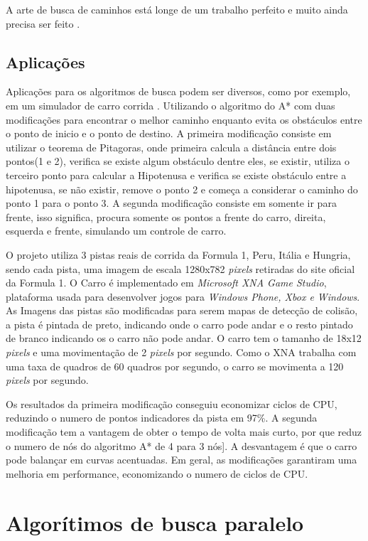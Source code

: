 A arte de busca de caminhos está longe de um trabalho perfeito e muito ainda precisa ser feito \cite{Pontevia}.

\subsection{Aplicações}
Aplicações para os algoritmos de busca podem ser diversos, como por exemplo, em um simulador de carro corrida \cite{JungTing}. Utilizando o algoritmo do A* com duas modificações para encontrar o melhor caminho enquanto evita os obstáculos entre o ponto de inicio e o ponto de destino. 
A primeira modificação consiste em utilizar o teorema de Pitagoras, onde primeira calcula a distância entre dois pontos(1 e 2), verifica se existe algum obstáculo dentre eles, se existir, utiliza o terceiro ponto para calcular a Hipotenusa e verifica se existe obstáculo entre a hipotenusa, se não existir, remove o ponto 2 e começa a considerar o caminho do ponto 1 para o ponto 3. A segunda modificação consiste em somente ir para frente, isso significa, procura somente os pontos a frente do carro, direita, esquerda e frente, simulando um controle de carro.

O projeto utiliza 3 pistas reais de corrida da Formula 1, Peru, Itália e Hungria, sendo cada pista, uma imagem de escala 1280x782 \textit{pixels} retiradas do site oficial da Formula 1. O Carro é implementado em \textit{Microsoft XNA Game Studio}, plataforma usada para desenvolver jogos para \textit{Windows Phone, Xbox e Windows}. As Imagens das pistas são modificadas para serem mapas de detecção de colisão, a pista é pintada de preto, indicando onde o carro pode andar e o resto pintado de branco indicando os o carro não pode andar. O carro tem o tamanho de 18x12 \textit{pixels} e uma movimentação de 2 \textit{pixels} por segundo. Como o XNA trabalha com uma taxa de quadros de 60 quadros por segundo, o carro se movimenta a 120 \textit{pixels} por segundo.

Os resultados da primeira modificação conseguiu economizar ciclos de CPU, reduzindo o numero de pontos indicadores da pista em 97\%. A segunda modificação tem a vantagem de obter o tempo de volta mais curto, por que reduz o numero de nós do algoritmo A* de 4 para 3 nós]. A desvantagem é que o carro pode balançar em curvas acentuadas. Em geral, as modificações garantiram uma melhoria em performance, economizando o numero de ciclos de CPU.


\section{Algorítimos de busca paralelo}

